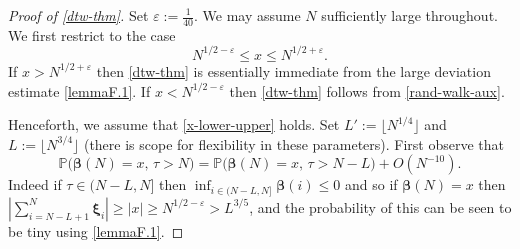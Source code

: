 \documentclass[11pt,reqno]{amsart}
\numberwithin{equation}{section}
\theoremstyle{definition}
\theoremstyle{remark}
\newcommand{\mb}{\mathbb}
\newcommand{\eps}{\varepsilon}
\def\boldbeta{\boldsymbol\beta}
\def\boldxi{\boldsymbol\xi}
\renewcommand{\le}{\leqslant}
\renewcommand{\ge}{\geqslant}
\begin{document}
\begin{proof}[Proof of \cref{dtw-thm}] Set $\eps := \frac{1}{40}$. 
We may assume $N$ sufficiently large throughout. We first restrict to the case
\begin{equation}\label{x-lower-upper} N^{1/2 - \eps} \le x \le N^{1/2 + \eps}.\end{equation}
If $x > N^{1/2 + \eps}$ then \cref{dtw-thm} is essentially immediate from the large deviation estimate \cref{lemmaF.1}. If $x < N^{1/2 - \eps}$ then \cref{dtw-thm} follows from \cref{rand-walk-aux}.

Henceforth, we assume that \cref{x-lower-upper} holds. Set $L' := \lfloor N^{1/4}\rfloor$ and $L := \lfloor N^{3/4}\rfloor$ (there is scope for flexibility in these parameters).
First observe that 
\[ \mb{P}\big(\boldbeta(N) = x,\, \tau > N\big) = \mb{P}\big(\boldbeta(N) = x, \, \tau > N - L) + O(N^{-10}).\]
Indeed if $\tau \in (N - L, N]$ then $\inf_{i \in (N - L, N]} \boldbeta(i) \le 0$ and so if $\boldbeta(N) = x$ then $|\sum_{i = N - L + 1}^N \boldxi_i| \ge |x| \ge N^{1/2 - \eps} > L^{3/5}$, and the probability of this can be seen to be tiny using \cref{lemmaF.1}.


\end{proof}
\end{document}
